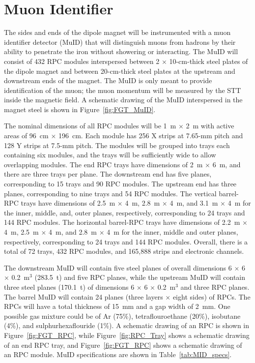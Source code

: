 \section{Muon Identifier}
\label{sec:nd-nnd-muid}

The sides and ends of the dipole magnet will be instrumented
with a muon identifier
detector (MuID) that will distinguish muons from hadrons by their  ability 
to penetrate the iron without showering or interacting.
The MuID will consist of 432 RPC modules
interspersed between 2 $\times$ 10-cm-thick steel plates  of the 
dipole magnet and between 20-cm-thick steel plates at the upstream and
downstream ends of the magnet. 
The MuID is only meant to provide %
identification of the 
muon; the muon momentum %
will be measured by the STT inside the 
magnetic field. A schematic drawing of the MuID 
interspersed in the magnet steel is shown in Figure~\ref{fig:FGT_MuID}.

The nominal dimensions of all RPC modules will be 1~m $\times$ 2~m with
active areas of 96~cm $\times$ 196~cm. Each
module has 256 X strips
at 7.65-mm pitch and 128 Y strips at 7.5-mm pitch. The modules
will be grouped into trays each containing six modules, and the trays will
be sufficiently wide to allow overlapping modules. 
The end RPC trays have dimensions of 2~m $\times$ 6~m, and there are three trays per plane.
The downstream end has five planes, corresponding to 15 trays and 90 RPC modules.
The upstream end has three planes, corresponding to nine trays and 54 RPC modules.
The vertical barrel-RPC trays have dimensions of 2.5~m $\times$ 4~m, 2.8~m $\times$ 4~m, and
3.1~m $\times$ 4~m for the inner, middle, and, outer planes, respectively, corresponding
to 24 trays and 144 RPC modules. The horizontal
barrel-RPC trays have dimensions of 2.2~m $\times$ 4~m, 2.5~m $\times$ 4~m, and
2.8~m $\times$ 4~m for the inner, middle and outer planes, respectively, 
corresponding to 24 trays and 144 RPC modules. Overall, there is a total of
72 trays, 432 RPC modules, and 165,888 strips and electronic channels. 

The downstream MuID will contain five steel planes of 
overall dimensions
6 $\times$ 6 $\times$ 0.2~m$^3$ (283.5~t)
and five RPC planes, while the upstream MuID will contain three steel
planes (170.1~t) of dimensions 6 $\times$ 6 $\times$ 0.2~m$^3$ and three RPC planes. The barrel MuID will contain
24 planes (three layers $\times$ eight sides) of RPCs. The RPCs will have a total thickness 
of 15~mm and a gap width of 2~mm. One possible gas mixture could be %
of Ar (75\%), tetraflouroethane (20\%), isobutane (4\%),
and sulphurhexaflouride (1\%). 
A schematic drawing of an RPC is shown in Figure~\ref{fig:FGT_RPC}, while
Figure~\ref{fig:RPC_Tray} shows a schematic drawing of an end RPC tray,
and Figure~\ref{fig:FGT_RPC} shows a schematic drawing of an RPC module.
MuID specifications are shown in Table~\ref{tab:MID_specs}.

